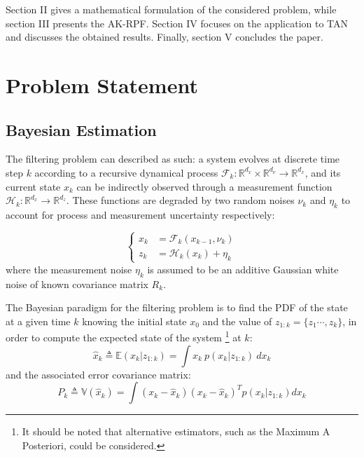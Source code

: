 \documentclass[conference]{IEEEtran}
\begin{document}
Section II gives a mathematical formulation of the considered problem, while section III presents the AK-RPF. Section IV focuses on the application to TAN and discusses the obtained results. Finally, section V concludes the paper.

\section{Problem Statement}

\subsection{Bayesian Estimation}

The filtering problem can described as such: a system evolves at discrete time step $k$ according to a recursive dynamical process $\mathcal{F}_k : \mathbb{R}^{d_x} \times \mathbb{R}^{d_\nu} \to \mathbb{R}^{d_x}$, and its current state $x_k$ can be indirectly observed through a measurement function $\mathcal{H}_k : \mathbb{R}^{d_x} \to \mathbb{R}^{d_z}$. These functions are degraded by two random noises $\nu_k$ and $\eta_k$ to account for process and measurement uncertainty respectively:

\begin{equation}
\left\{
\begin{aligned}
x_k & = \mathcal{F}_k(x_{k-1}, \nu_k) \\
z_k & = \mathcal{H}_k(x_k) + \eta_k
\end{aligned}
\right. \label{eq:process measure}
\end{equation}
where the measurement noise $\eta_k$ is assumed to be an additive Gaussian white noise of known covariance matrix $R_k$.

The Bayesian paradigm for the filtering problem is to find the PDF of the state at a given time $k$ knowing the initial state $x_0$ and the value of $z_{1:k} = \{z_1 \cdots, z_k\}$, in order to compute the expected state of the system \footnote{It should be noted that alternative estimators, such as the Maximum A Posteriori, could be considered.} at $k$:
\begin{equation}
\hat x_k \triangleq \mathbb{E}(x_k|z_{1:k}) = \int x_k \: p(x_k|z_{1:k}) \: dx_k \label{eq:expectation}
\end{equation}
and the associated error covariance matrix:
\begin{equation}
P_k \triangleq \mathbb{V}(\hat{x}_k) = \int (x_k - \hat{x}_k)(x_k - \hat{x}_k)^T p(x_k|z_{1:k}) dx_k
\end{equation}
\end{document}
